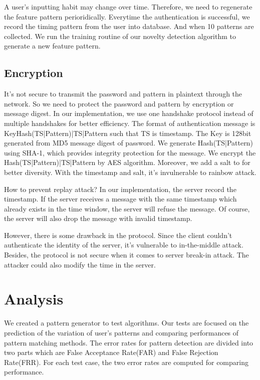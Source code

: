 \documentclass[twocolumn,showpacs,%
  nofootinbib,aps,%
  eqsecnum,prd,notitlepage,showkeys,10pt]{revtex4-1}
\begin{document}
A user's inputting habit may change over time. Therefore, we need to regenerate the feature pattern perioridically. Everytime the authentication is successful, we record the timing pattern from the user into database. And when 10 patterns are collected. We run the training routine of our novelty detection algorithm to generate a new feature pattern.

\subsection{Encryption}
It's not secure to transmit the password and pattern in plaintext through the network. So we need to protect the password and pattern by encryption or message digest. In our implementation, we use one handshake protocol instead of multiple handshakes for better efficiency. The format of authentication message is Key{Hash(TS|Pattern)|TS|Pattern} such that TS is timestamp. The Key is 128bit generated from MD5 message digest of password. We generate Hash(TS|Pattern) using SHA-1, which provides integrity protection for the message. We encrypt the Hash(TS|Pattern)|TS|Pattern by AES algorithm. Moreover, we add a salt to for better diversity. With the timestamp and salt, it's invulnerable to rainbow attack.
\par
How to prevent replay attack? In our implementation, the server record the timestamp. If the server receives a message with the same timestamp which already exists in the time window, the server will refuse the message. Of course, the server will also drop the message with invalid timestamp.
\par
However, there is some drawback in the protocol. Since the client couldn't authenticate the identity of the server, it's vulnerable to in-the-middle attack. Besides, the protocol is not secure when it comes to server break-in attack. The attacker could also modify the time in the server.



\section{Analysis}
 We created a pattern generator to test algorithms. Our tests are focused on the prediction of the variation of user's patterns and comparing performances of pattern matching methods. The error rates for pattern detection are divided into two parts which are False Acceptance Rate(FAR) and False Rejection Rate(FRR)\cite{cho2000web}. For each test case, the two error rates are computed for comparing performance.
\end{document}
